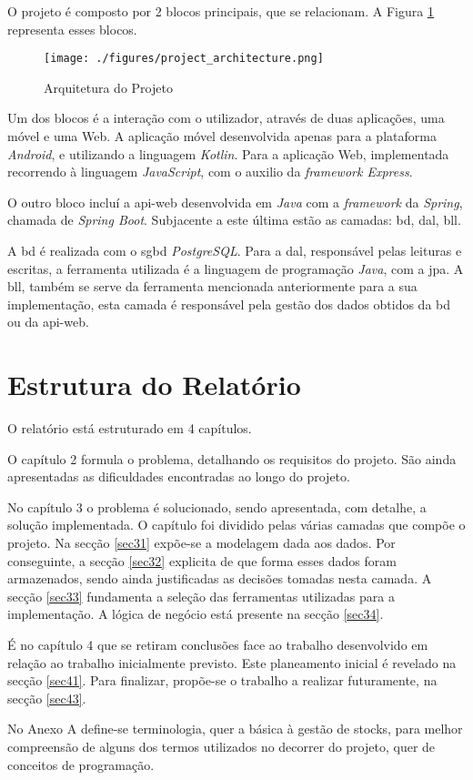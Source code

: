 O projeto é composto por 2 blocos principais, que se relacionam. A Figura \ref{project-architecture} representa esses blocos. 

\begin{figure}[H]
	\centering
	\texttt{[image: ./figures/project\_architecture.png]}
	\caption{Arquitetura do Projeto}
	\label{project-architecture}
\end{figure}

Um dos blocos é a interação com o utilizador, através de duas aplicações, uma móvel e uma Web. A aplicação móvel desenvolvida apenas para a plataforma \textit{Android}, e utilizando a linguagem \textit{Kotlin}. Para a aplicação Web, implementada recorrendo à linguagem \textit{JavaScript}, com o auxilio da \textit{framework Express}. 

O outro bloco incluí a \gls{api-web} desenvolvida em \textit{Java} com a \textit{framework} da \textit{Spring}, chamada de \textit{Spring Boot}. Subjacente a este última estão as camadas: \acrfull{bd}, \acrfull{dal}, \acrfull{bll}.

A \acrshort{bd} é realizada com o \acrfull{sgbd} \textit{PostgreSQL}. Para a \acrshort{dal}, responsável pelas leituras e escritas, a ferramenta utilizada é a linguagem de programação \textit{Java}, com a \acrfull{jpa}. A \acrshort{bll}, também se serve da ferramenta mencionada anteriormente para a sua implementação, esta camada é responsável pela gestão dos dados obtidos da \acrshort{bd} ou da \gls{api-web}.


%
%
\section{Estrutura do Relatório} \label{sec14}
O relatório está estruturado em 4 capítulos.

O capítulo 2 formula o problema, detalhando os requisitos do projeto. São ainda apresentadas as dificuldades encontradas ao longo do projeto. 

No capítulo 3 o problema é solucionado, sendo apresentada, com detalhe, a solução implementada. O capítulo foi dividido pelas várias camadas que compõe o projeto. Na secção \ref{sec31} expõe-se a modelagem dada aos dados. Por conseguinte, a secção \ref{sec32} explicita de que forma esses dados foram armazenados, sendo ainda justificadas as decisões tomadas nesta camada. A secção \ref{sec33} fundamenta a seleção das ferramentas utilizadas para a implementação. A lógica de negócio está presente na secção \ref{sec34}. 

É no capítulo 4 que se retiram conclusões face ao trabalho desenvolvido em relação ao trabalho inicialmente previsto. Este planeamento inicial é revelado na secção \ref{sec41}. Para finalizar, propõe-se o trabalho a realizar futuramente, na secção \ref{sec43}.

No Anexo A define-se terminologia, quer a básica à gestão de stocks, para melhor compreensão de alguns dos termos utilizados no decorrer do projeto, quer de conceitos de programação.
